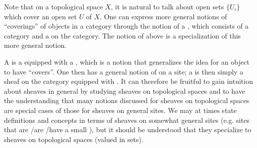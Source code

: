 Note that on a topological space $X$, it is natural to talk about open sets $\{U_i\}$ which cover an open set $U$ of $X$. One can express more general notions of ``coverings'' of objects in a category through the notion of a , which consists of a category and a  on the category. The notion of  above is a specialization of this more general notion.

A  is a  equipped with a , which is a notion that generalizes the idea for an object to have ``covers''. One then has a general notion of  on a site; a  is then simply a sheaf on the category  equipped with . It can therefore be fruitful to gain intuition about sheaves in general by studying sheaves on topological spaces and to have the understanding that many notions discussed for sheaves on topological spaces are special cases of those for sheaves on general sites. We may at times state definitions and concepts in terms of sheaves on somewhat general sites (e.g. sites that are /are /have a small ), but it should be understood that they specialize to sheaves on topological spaces (valued in sets).

